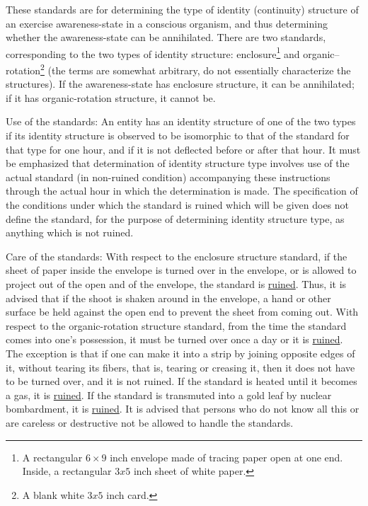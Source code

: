 These standards are for determining the type of identity 
(continuity) structure of an exercise awareness-state in a
conscious organism, and thus determining whether the awareness-state
can be annihilated. There are two standards, corresponding
to the two types of identity structure: enclosure\footnote{A rectangular $6\times9$ inch envelope made of tracing paper open at one end. Inside, a rectangular $3x5$ inch sheet of white paper.} and 
organic--rotation\footnote{A blank white $3x5$ inch card.} (the terms are somewhat arbitrary, do not
essentially characterize the structures). If the awareness-state
has enclosure structure, it can be annihilated; if it 
has organic-rotation structure, it cannot be. 

Use of the standards: An entity has an identity structure
of one of the two types if its identity structure is observed 
to be isomorphic to that of the standard for that type for one
hour, and if it is not deflected before or after that hour. 
It must be emphasized that determination of identity structure
type involves use of the actual standard (in non-ruined condition)
accompanying these instructions through the actual hour
in which the determination is made. The specification of the
conditions under which the standard is ruined which will be 
given does not define the standard, for the purpose of determining
identity structure type, as anything which is not ruined. 

Care of the standards: With respect to the enclosure 
structure standard, if the sheet of paper inside the envelope
is turned over in the envelope, or is allowed to project out
of the open and of the envelope, the standard is \uline{ruined}. Thus, 
it is advised that if the shoot is shaken around in the envelope,
a hand or other surface be held against the open end to prevent
the sheet from coming out. With respect to the organic-rotation 
structure standard, from the time the standard comes into one's
possession, it must be turned over once a day or it is \uline{ruined}.
The exception is that if one can make it into a strip by
joining opposite edges of it, without tearing its fibers, that
is, tearing or creasing it, then it does not have to be turned
over, and it is not ruined. If the standard is heated until it
becomes a gas, it is \uline{ruined}. If the standard is transmuted into 
a gold leaf by nuclear bombardment, it is \uline{ruined}. It is advised
that persons who do not know all this or are careless or destructive
not be allowed to handle the standards.

\clearpage
